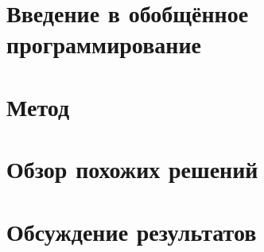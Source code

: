 \documentclass[a4paper,twoside,11pt]{article}
\numberwithin{equation}{section}
\begin{document}


\section{Введение в обобщённое программирование}
\label{sec:tutorial}


%
%

\section{Метод}
\label{sec:implementation}


\section{Обзор похожих решений}
\label{sec:relatedworks}




\section{Обсуждение результатов}
\label{sec:discussion}



%






\end{document}
